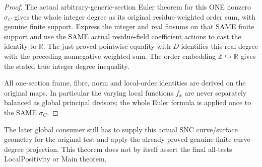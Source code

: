 \begin{proof}
The actual arbitrary-generic-section Euler theorem for this ONE nonzero
$\sigma_C$ gives the whole integer degree as its original residue-weighted
order sum, with genuine finite support.  Express the integer and real
finsums on that SAME finite support and use the SAME actual residue-field
coefficient actions to cast the identity to $\mathbb R$.  The just proved
pointwise equality with $D$ identifies this real degree with the preceding
nonnegative weighted sum.  The order embedding $\mathbb Z\hookrightarrow
\mathbb R$ gives the stated true integer degree inequality.

All one-section frame, fibre, norm and local-order identities are derived
on the original maps.  In particular the varying local functions $f_x$
are never separately balanced as global principal divisors; the whole
Euler formula is applied once to the SAME $\sigma_C$.
\end{proof}

The later global consumer still has to supply this actual SNC curve/surface
geometry for the original test and apply the already proved genuine finite
curve-degree projection.  This theorem does not by itself assert the final
all-tests LocalPositivity or Main theorem.
